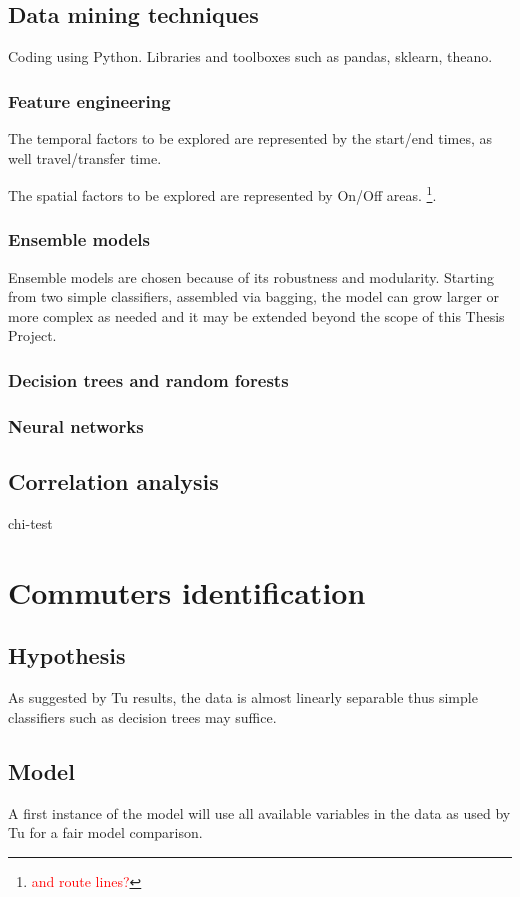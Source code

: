 \documentclass{article}
\newcommand{\selfnote}[1]{\footnote{\textcolor{red}{#1}}}
\begin{document}
\subsection{Data mining techniques}
Coding using Python. Libraries and toolboxes such as pandas, sklearn, theano.

\subsubsection{Feature engineering}
The temporal factors to be explored are represented by the start/end times, as well travel/transfer time.

The spatial factors to be explored are represented by On/Off areas. \selfnote{and route lines?}. 

\subsubsection{Ensemble models}
Ensemble models are chosen because of its robustness and modularity. Starting from two simple classifiers, assembled via bagging, the model can grow larger or more complex as needed and it may be extended beyond the scope of this Thesis Project. 

\subsubsection{Decision trees and random forests}

\subsubsection{Neural networks}

\subsection{Correlation analysis}
chi-test


\newpage
\section{Commuters identification}
\subsection{Hypothesis}
As suggested by Tu \cite{tu2016impact} results, the data is almost linearly separable thus simple classifiers such as decision trees may suffice. 


\subsection{Model}
A first instance of the model will use all available variables in the data as used by Tu \cite{tu2016impact} for a fair model comparison. 
\end{document}
